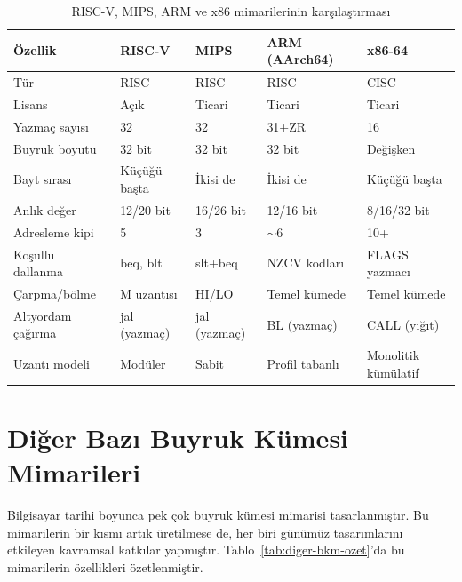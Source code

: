 \begin{table}[H]
\centering
\caption{RISC-V, MIPS, ARM ve x86 mimarilerinin karşılaştırması}
\label{tab:dort-mimari-karsilastirma}
\small
\begin{tabular}{lllll}
\toprule
\textbf{Özellik} & \textbf{RISC-V} & \textbf{MIPS} & \textbf{ARM (AArch64)} & \textbf{x86-64} \\
\midrule
Tür          & RISC       & RISC       & RISC       & CISC \\
Lisans       & Açık       & Ticari     & Ticari     & Ticari \\
Yazmaç sayısı & 32        & 32         & 31+ZR      & 16 \\
Buyruk boyutu & 32 bit    & 32 bit     & 32 bit     & Değişken \\
Bayt sırası  & Küçüğü başta & İkisi de & İkisi de  & Küçüğü başta \\
Anlık değer  & 12/20 bit  & 16/26 bit  & 12/16 bit  & 8/16/32 bit \\
Adresleme kipi & 5          & 3          & $\sim$6    & 10+ \\
Koşullu dallanma & beq, blt  & slt+beq   & NZCV kodları & FLAGS yazmacı \\
Çarpma/bölme & M uzantısı  & HI/LO     & Temel kümede & Temel kümede \\
Altyordam çağırma & jal (yazmaç) & jal (yazmaç) & BL (yazmaç) & CALL (yığıt) \\
Uzantı modeli & Modüler    & Sabit      & Profil tabanlı & Monolitik kümülatif \\
\bottomrule
\end{tabular}
\end{table}


\section{Diğer Bazı Buyruk Kümesi Mimarileri}
\label{sec:diger-bkm}

Bilgisayar tarihi boyunca pek çok buyruk kümesi mimarisi tasarlanmıştır. Bu mimarilerin bir kısmı artık üretilmese de, her biri günümüz tasarımlarını etkileyen kavramsal katkılar yapmıştır. Tablo~\ref{tab:diger-bkm-ozet}'da bu mimarilerin özellikleri özetlenmiştir.

